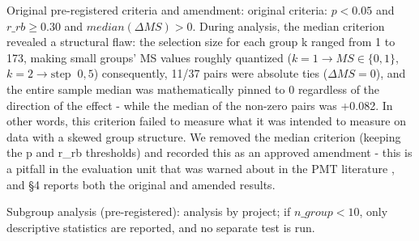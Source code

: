 Original pre-registered criteria and amendment: original criteria: $p<0.05$ and $r\_rb \geq 0.30$ and $median(\Delta MS)>0$. During analysis, the median criterion revealed a structural flaw: the selection size for each group k ranged from 1 to 173, making small groups' MS values roughly quantized ($k=1 \rightarrow MS \in \{0,1\}$, $k=2 \rightarrow \text{step }\ 0{,}5$) consequently, 11/37 pairs were absolute ties ($\Delta MS=0$), and the entire sample median was mathematically pinned to 0 regardless of the direction of the effect - while the median of the non-zero pairs was +0.082. In other words, this criterion failed to measure what it was intended to measure on data with a skewed group structure. We removed the median criterion (keeping the p and r\_rb thresholds) and recorded this as an approved amendment - this is a pitfall in the evaluation unit that was warned about in the PMT literature \cite{delgadoperez2026pitfalls}, and \S4 reports both the original and amended results.

Subgroup analysis (pre-registered): analysis by project; if $n\_group < 10$, only descriptive statistics are reported, and no separate test is run.